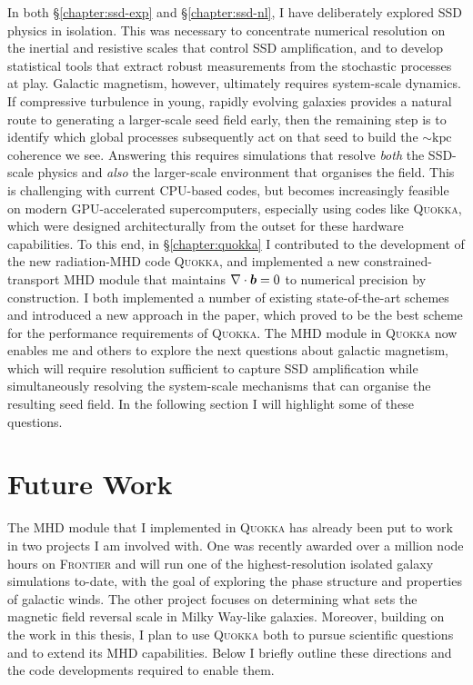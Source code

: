 In both \S\ref{chapter:ssd-exp} and \S\ref{chapter:ssd-nl}, I have deliberately explored SSD physics in isolation. This was necessary to concentrate numerical resolution on the inertial and resistive scales that control SSD amplification, and to develop statistical tools that extract robust measurements from the stochastic processes at play. Galactic magnetism, however, ultimately requires system-scale dynamics. If compressive turbulence in young, rapidly evolving galaxies provides a natural route to generating a larger-scale seed field early, then the remaining step is to identify which global processes subsequently act on that seed to build the $\sim \mathrm{kpc}$ coherence we see. Answering this requires simulations that resolve \textit{both} the SSD-scale physics and \textit{also} the larger-scale environment that organises the field. This is challenging with current CPU-based codes, but becomes increasingly feasible on modern GPU-accelerated supercomputers, especially using codes like \textsc{Quokka}, which were designed architecturally from the outset for these hardware capabilities. To this end, in \S\ref{chapter:quokka} I contributed to the development of the new radiation-MHD code \textsc{Quokka}, and implemented a new constrained-transport MHD module that maintains $\nabla\cdot\bm{b} = 0$ to numerical precision by construction. I both implemented a number of existing state-of-the-art schemes and introduced a new approach in the paper, which proved to be the best scheme for the performance requirements of \textsc{Quokka}. The MHD module in \textsc{Quokka} now enables me and others to explore the next questions about galactic magnetism, which will require resolution sufficient to capture SSD amplification while simultaneously resolving the system-scale mechanisms that can organise the resulting seed field. In the following section I will highlight some of these questions.

\section{Future Work}

The MHD module that I implemented in \textsc{Quokka} has already been put to work in two projects I am involved with. One was recently awarded over a million node hours on \textsc{Frontier} and will run one of the highest-resolution isolated galaxy simulations to-date, with the goal of exploring the phase structure and properties of galactic winds. The other project focuses on determining what sets the magnetic field reversal scale in Milky Way-like galaxies. Moreover, building on the work in this thesis, I plan to use \textsc{Quokka} both to pursue scientific questions and to extend its MHD capabilities. Below I briefly outline these directions and the code developments required to enable them.

